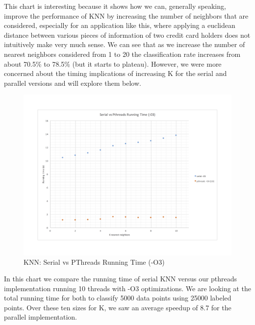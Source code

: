 \documentclass{article}
\begin{document}
This chart is interesting because it shows how we can, generally speaking, improve the performance of KNN by increasing the number of neighbors that are considered, especially for an application like this, where applying a euclidean distance between various pieces of information of two credit card holders does not intuitively make very much sense. We can see that as we increase the number of nearest neighbors considered from 1 to 20 the classification rate increases from about 70.5\% to 78.5\% (but it starts to plateau). However, we were more concerned about the timing implications of increasing K for the serial and parallel versions and will explore them below.
\clearpage
\begin{figure}[!htbp]
\begin{center}
\includegraphics[width=1.0\textwidth]{runningtimeKNN} %
\caption{KNN: Serial vs PThreads Running Time (-O3)}
\end{center}
\end{figure}

In this chart we compare the running time of serial KNN versus our pthreads implementation running 10 threads with -O3 optimizations. We are looking at the total running time for both to classify 5000 data points using 25000 labeled points. Over these ten sizes for K, we saw an average speedup of 8.7 for the parallel implementation. \\
\end{document}
